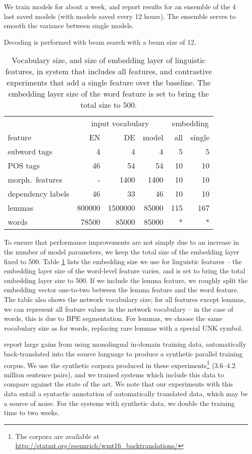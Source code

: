 \documentclass[11pt]{article}
\begin{document}
We train models for about a week, and report results for an ensemble of the 4 last saved models (with models saved every 12 hours).
The ensemble serves to smooth the variance between single models.

Decoding is performed with beam search with a beam size of 12.

\begin{table}
\centering
\small
\setlength\tabcolsep{3pt}
\begin{tabular}{l|rrr|rr}
& \multicolumn{3}{c|}{input vocabulary} & \multicolumn{2}{c}{embedding} \\
feature & EN & DE & model & all & single \\
\hline
subword tags & 4 & 4 & 4 & 5 & 5\\
POS tags & 46 & 54 & 54 & 10 & 10\\
morph.\ features & - & 1400 & 1400 & 10 & 10\\
dependency labels & 46 & 33 & 46& 10 & 10\\
lemmas & 800000 & 1500000 & 85000 & 115 & 167\\
words & 78500 & 85000 & 85000 & * & *\\
\end{tabular}
\caption{Vocabulary size, and size of embedding layer of linguistic features, in system that includes all features, and contrastive experiments that add a single feature over the baseline. The embedding layer size of the word feature is set to bring the total size to 500.}
\label{dim}
\end{table}

To ensure that performance improvements are not simply due to an increase in the number of model parameters, we keep the total size of the embedding layer fixed to 500.
Table \ref{dim} lists the embedding size we use for linguistic features -- the embedding layer size of the word-level feature varies, and is set to bring the total embedding layer size to 500.
If we include the lemma feature, we roughly split the embedding vector one-to-two between the lemma feature and the word feature.
The table also shows the network vocabulary size; for all features except lemmas, we can represent all feature values in the network vocabulary -- in the case of words, this is due to BPE segmentation.
For lemmas, we choose the same vocabulary size as for words, replacing rare lemmas with a special UNK symbol.

 report large gains from using monolingual in-domain training data, automatically back-translated into the source language to produce a synthetic parallel training corpus.
We use the synthetic corpora produced in these experiments\footnote{The corpora are available at \url{http://statmt.org/rsennrich/wmt16_backtranslations/}} (3.6--4.2 million sentence pairs), and we trained systems which include this data to compare against the state of the art.
We note that our experiments with this data entail a syntactic annotation of automatically translated data, which may be a source of noise.
For the systems with synthetic data, we double the training time to two weeks.
\end{document}
